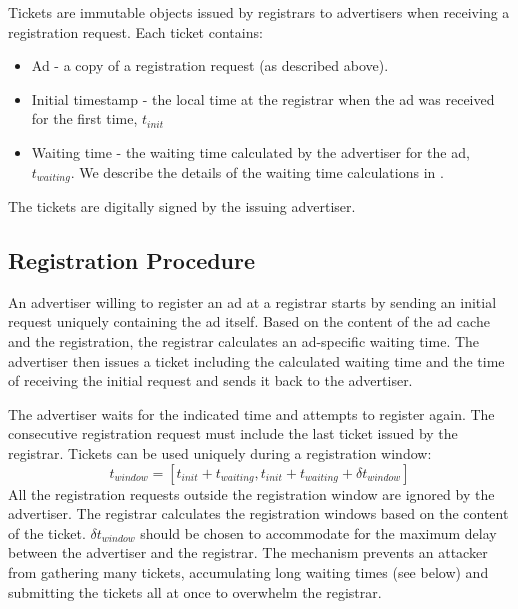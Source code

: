 Tickets are immutable objects issued by registrars to advertisers when receiving a registration request. Each ticket contains:
\begin{itemize}
    \item Ad - a copy of a registration request (as described above). 
    \item Initial timestamp - the local time at the registrar when the ad was received for the first time, $t_\textit{init}$
    \item Waiting time - the waiting time calculated by the advertiser for the ad, $t_\textit{waiting}$. We describe the details of the waiting time calculations in . 
\end{itemize}
The tickets are digitally signed by the issuing advertiser. 

\subsection{Registration Procedure}
An advertiser willing to register an ad at a registrar starts by sending an
initial request uniquely containing the ad itself. Based on the
content of the ad cache and the registration, the registrar calculates an
ad-specific waiting time. The advertiser then issues a ticket including the
calculated waiting time and the time of receiving the initial request and sends it back to the advertiser.

The advertiser waits for the indicated time and attempts to register again. The consecutive registration request must include the last ticket issued by the registrar. Tickets can be used uniquely during a registration window:
\begin{equation}\label{eq:registration_window}
    t_\textit{window} = [t_\textit{init} + t_\textit{waiting}, t_\textit{init} + t_\textit{waiting} + \delta t_\textit{window}]
\end{equation}
All the registration requests outside the registration window are ignored by the advertiser. The registrar calculates the registration windows based on the content of the ticket. $\delta t_\textit{window}$ should be chosen to accommodate for the maximum delay between the advertiser and the registrar. The mechanism prevents an attacker from gathering many tickets, accumulating long waiting times (see below) and submitting the tickets all at once to overwhelm the registrar. 

